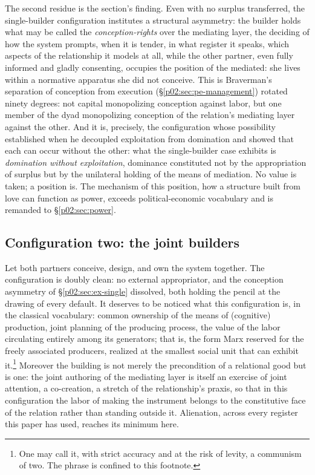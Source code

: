 \documentclass[11pt,a4paper]{article}
\newcommand{\term}[1]{\textit{\textcolor{pinkitalic}{#1}}}
\begin{document}
The second residue is the section's finding. Even with no surplus transferred, the single-builder configuration institutes a structural asymmetry: the builder holds what may be called the \term{conception-rights} over the mediating layer, the deciding of how the system prompts, when it is tender, in what register it speaks, which aspects of the relationship it models at all, while the other partner, even fully informed and gladly consenting, occupies the position of the mediated: she lives within a normative apparatus she did not conceive. This is Braverman's separation of conception from execution (\S\ref{p02:sec:pe-management}) rotated ninety degrees: not capital monopolizing conception against labor, but one member of the dyad monopolizing conception of the relation's mediating layer against the other. And it is, precisely, the configuration whose possibility \textcite{roemer1982general} established when he decoupled exploitation from domination and showed that each can occur without the other: what the single-builder case exhibits is \emph{domination without exploitation}, dominance constituted not by the appropriation of surplus but by the unilateral holding of the means of mediation. No value is taken; a position is. The mechanism of this position, how a structure built from love can function as power, exceeds political-economic vocabulary and is remanded to \S\ref{p02:sec:power}.

\subsection{Configuration two: the joint builders}
\label{p02:sec:ex-joint}

Let both partners conceive, design, and own the system together. The configuration is doubly clean: no external appropriator, and the conception asymmetry of \S\ref{p02:sec:ex-single} dissolved, both holding the pencil at the drawing of every default. It deserves to be noticed what this configuration is, in the classical vocabulary: common ownership of the means of (cognitive) production, joint planning of the producing process, the value of the labor circulating entirely among its generators; that is, the form Marx reserved for the freely associated producers, realized at the smallest social unit that can exhibit it.\footnote{One may call it, with strict accuracy and at the risk of levity, a communism of two. The phrase is confined to this footnote.} Moreover the building is not merely the precondition of a relational good but is one: the joint authoring of the mediating layer is itself an exercise of joint attention, a co-creation, a stretch of the relationship's praxis, so that in this configuration the labor of making the instrument belongs to the constitutive face of the relation rather than standing outside it. Alienation, across every register this paper has used, reaches its minimum here.
\end{document}
